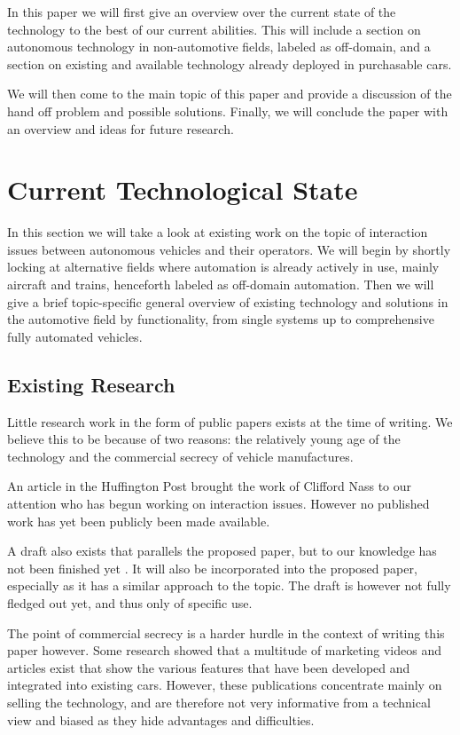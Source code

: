 \documentclass{acm_proc_article-sp}
\begin{document}
In this paper we will first give an overview over the current state of the technology to the best of our current abilities.
This will include a section on autonomous technology in non-automotive fields, labeled as off-domain, and a section on existing and available technology already deployed in purchasable cars.

We will then come to the main topic of this paper and provide a discussion of the hand off problem and possible solutions.
Finally, we will conclude the paper with an overview and ideas for future research.

\section{Current Technological State}

In this section we will take a look at existing work on the topic of interaction issues between autonomous vehicles and their operators.
We will begin by shortly locking at alternative fields where automation is already actively in use, mainly aircraft and trains, henceforth labeled as off-domain automation.
Then we will give a brief topic-specific general overview of existing technology and solutions in the automotive field by functionality, from single systems up to comprehensive fully automated vehicles.

\subsection{Existing Research}

Little research work in the form of public papers exists at the time of writing.
We believe this to be because of two reasons: the relatively young age of the technology and the commercial secrecy of vehicle manufactures.

An article in the Huffington Post \cite{www:huffington_post} brought the work of Clifford Nass to our attention who has begun working on interaction issues.
However no published work has yet been publicly been made available.

A draft also exists that parallels the proposed paper, but to our knowledge has not been finished yet \cite{cummings:authority}.
It will also be incorporated into the proposed paper, especially as it has a similar approach to the topic.
The draft is however not fully fledged out yet, and thus only of specific use.

The point of commercial secrecy is a harder hurdle in the context of writing this paper however.
Some research showed that a multitude of marketing videos and articles exist that show the various features that have been developed and integrated into existing cars.
However, these publications concentrate mainly on selling the technology, and are therefore not very informative from a technical view and biased as they hide advantages and difficulties.
\end{document}
